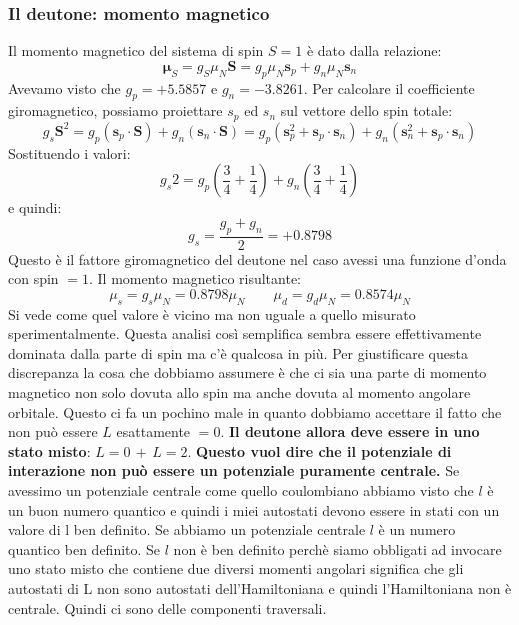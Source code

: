 \subsubsection{Il deutone: momento magnetico}
Il momento magnetico del sistema di spin $S=1$ è dato dalla relazione:
\begin{equation*}
    \bm{\mu}_S=g_S\mu_N\mathbf{S}=g_p\mu_N\mathbf{s}_p+g_n\mu_N\mathbf{s}_n
\end{equation*}
Avevamo visto che $g_p=+5.5857$ e $g_n=-3.8261$. Per calcolare il coefficiente giromagnetico, possiamo proiettare $s_p$ ed $s_n$ sul vettore dello spin totale:
\begin{equation*}
    g_s\mathbf{S}^2=g_p(\mathbf{s}_p\cdot\mathbf{S})+g_n(\mathbf{s}_n\cdot\mathbf{S})=g_p(\mathbf{s}_p^2+\mathbf{s}_p\cdot\mathbf{s}_n)+g_n(\mathbf{s}_n^2+\mathbf{s}_p\cdot\mathbf{s}_n)
\end{equation*}
Sostituendo i valori:
\begin{equation*}
    g_s2=g_p\left(\frac{3}{4}+\frac{1}{4}\right)+g_n\left(\frac{3}{4}+\frac{1}{4}\right)
\end{equation*}
e quindi:
\begin{equation*}
    g_s=\frac{g_p+g_n}{2}=+0.8798
\end{equation*}
Questo è il fattore giromagnetico del deutone nel caso avessi una funzione d'onda con spin $=1$. Il momento magnetico risultante:
\begin{equation*}
    \mu_s=g_s\mu_N=0.8798\mu_N \qquad \mu_d=g_d\mu_N=0.8574\mu_N
\end{equation*}
Si vede come quel valore è vicino ma non uguale a quello misurato sperimentalmente. Questa analisi così semplifica sembra essere effettivamente dominata dalla parte di spin ma c'è qualcosa in più. Per giustificare questa discrepanza la cosa che dobbiamo assumere è che ci sia una parte di momento magnetico non solo dovuta allo spin ma anche dovuta al momento angolare orbitale. Questo ci fa un pochino male in quanto dobbiamo accettare il fatto che non può essere $L$ esattamente $=0$. \textbf{Il deutone allora deve essere in uno stato misto}: $L=0\,+\,L=2$. \textbf{Questo vuol dire che il potenziale di interazione non può essere un potenziale puramente centrale.} Se avessimo un potenziale centrale come quello coulombiano abbiamo visto che $l$ è un buon numero quantico e quindi i miei autostati devono essere in stati con un valore di l ben definito. Se abbiamo un potenziale centrale $l$ è un numero quantico ben definito. Se $l$ non è ben definito perchè siamo obbligati ad invocare uno stato misto che contiene due diversi momenti angolari significa che gli autostati di L non sono autostati dell'Hamiltoniana e quindi l'Hamiltoniana non è centrale. Quindi ci sono delle componenti traversali.
